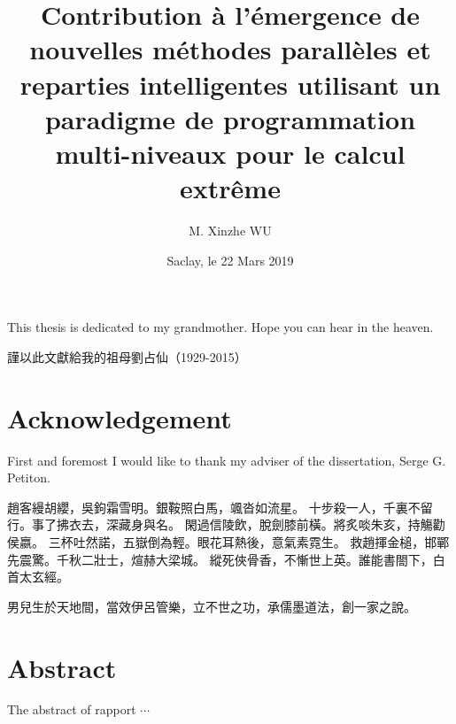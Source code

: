 \documentclass{xinzhewu}
\title{\large \textrm{Contribution \`a l’\'emergence de nouvelles m\'ethodes parall\`eles et reparties intelligentes utilisant un paradigme de programmation multi-niveaux pour le calcul extr\^eme}}
\author{M. Xinzhe WU}
\date{Saclay, le 22 Mars 2019}
\newenvironment{dedication}
{\clearpage           %
	\thispagestyle{empty}%
	\vspace*{\stretch{1}}%
	\itshape             %
	\raggedleft          %
}
{\par %
	\vspace{\stretch{3}} %
	\clearpage           %
}
\begin{document}
\maketitle
 
\clearemptydoublepage
\begin{dedication}
	\normalsize
	This thesis is dedicated to my grandmother. Hope you can hear in the heaven.
	
	\vspace{0.2in}
	\begin{CJK*}{UTF8}{bsmi}
		{
			\large
			謹以此文獻給我的祖母劉占仙（1929-2015）}
	\end{CJK*}

\end{dedication}

\clearemptydoublepage

\chapter*{Acknowledgement}
\thispagestyle{empty}
First and foremost I would like to thank my adviser of the dissertation, Serge G. Petiton.


\begin{CJK*}{UTF8}{bsmi}
	{
	趙客縵胡纓，吳鉤霜雪明。銀鞍照白馬，颯沓如流星。
	十步殺一人，千裏不留行。事了拂衣去，深藏身與名。
	閑過信陵飲，脫劍膝前橫。將炙啖朱亥，持觴勸侯嬴。
	三杯吐然諾，五嶽倒為輕。眼花耳熱後，意氣素霓生。
	救趙揮金槌，邯鄲先震驚。千秋二壯士，煊赫大梁城。
	縱死俠骨香，不慚世上英。誰能書閤下，白首太玄經。}
	
	{男兒生於天地間，當效伊呂管樂，立不世之功，承儒墨道法，創一家之說。}
\end{CJK*}


\clearemptydoublepage
\chapter*{Abstract}
\thispagestyle{empty}
The abstract of rapport $\cdots$

\clearemptydoublepage


\clearemptydoublepage

\frontmatter

{\small \tableofcontents}

{\small
\listoffigures
{}
}

{\small
\listoftables
{}
}
\end{document}
